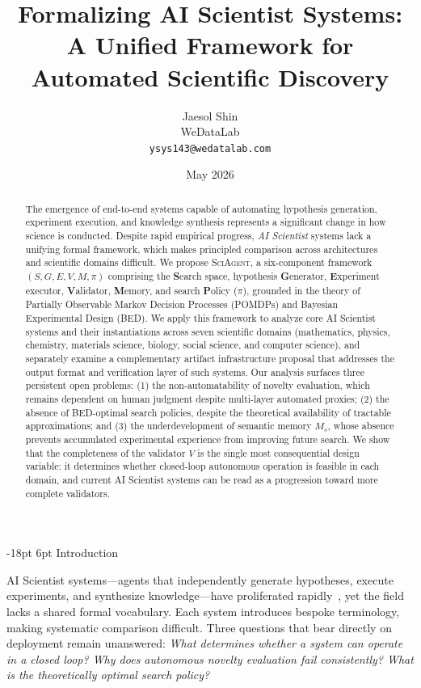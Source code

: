 \documentclass[11pt]{article}
\title{\textbf{Formalizing AI Scientist Systems:\\
A Unified Framework for Automated Scientific Discovery}}
\author{
  Jaesol Shin\\
  \small{WeDataLab}\\
  \texttt{ysys143@wedatalab.com}
}
\date{May 2026}
\makeatletter
\renewcommand\section{\@startsection{section}{1}{\z@}%
  {-18pt \@plus -4pt \@minus -2pt}%
  {6pt \@plus 2pt}%
  {\normalfont\large\bfseries}}
\newcommand{\sgmvpi}{$(S, G, E, V, M, \pi)$}
\newcommand{\framework}{\textsc{SciAgent}}
\makeatother
\begin{document}
\maketitle

\begin{abstract}
The emergence of end-to-end systems capable of automating hypothesis generation, experiment execution, and knowledge synthesis represents a significant change in how science is conducted. Despite rapid empirical progress, \emph{AI Scientist} systems lack a unifying formal framework, which makes principled comparison across architectures and scientific domains difficult. We propose \framework{}, a six-component framework \sgmvpi{} comprising the \textbf{S}earch space, hypothesis \textbf{G}enerator, \textbf{E}xperiment executor, \textbf{V}alidator, \textbf{M}emory, and search \textbf{P}olicy ($\pi$), grounded in the theory of Partially Observable Markov Decision Processes (POMDPs) and Bayesian Experimental Design (BED). We apply this framework to analyze core AI Scientist systems and their instantiations across seven scientific domains (mathematics, physics, chemistry, materials science, biology, social science, and computer science), and separately examine a complementary artifact infrastructure proposal that addresses the output format and verification layer of such systems. Our analysis surfaces three persistent open problems: (1) the non-automatability of novelty evaluation, which remains dependent on human judgment despite multi-layer automated proxies; (2) the absence of BED-optimal search policies, despite the theoretical availability of tractable approximations; and (3) the underdevelopment of semantic memory $M_s$, whose absence prevents accumulated experimental experience from improving future search. We show that the completeness of the validator $V$ is the single most consequential design variable: it determines whether closed-loop autonomous operation is feasible in each domain, and current AI Scientist systems can be read as a progression toward more complete validators.
\end{abstract}

\section{Introduction}

AI Scientist systems---agents that independently generate hypotheses, execute experiments, and synthesize knowledge---have proliferated rapidly~\citep{boiko2023emergent,lu2024aiscientist,lu2026aiscientist,schmidgall2025agentlab,google2026aletheia,liu2026lasthuman}, yet the field lacks a shared formal vocabulary. Each system introduces bespoke terminology, making systematic comparison difficult. Three questions that bear directly on deployment remain unanswered: \textit{What determines whether a system can operate in a closed loop? Why does autonomous novelty evaluation fail consistently? What is the theoretically optimal search policy?}
\end{document}
